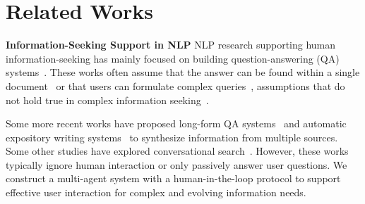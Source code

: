 \documentclass[11pt]{article}
\begin{document}



\section{Related Works}

\noindent
\textbf{Information-Seeking Support in NLP}\quad
NLP research supporting human information-seeking has mainly focused on building question-answering (QA) systems~\citep{chen-etal-2017-reading, lee-etal-2019-latent,dasigi-etal-2021-dataset,levy-etal-2021-open,yuan-etal-2020-interactive-machine}. These works often assume that the answer can be found within a single document~\citep{clark-etal-2020-tydi} or that users can formulate complex queries~\citep{yang-etal-2018-hotpotqa,chen2021open,ahmadvand2023making}, assumptions that do not hold true in complex information seeking~\citep{butler2000learners,booth2009craft,bystrom1995task}.


Some more recent works have proposed long-form QA systems~\citep{xu-etal-2023-critical,xu2024kiwi} and automatic expository writing systems~\citep{balepur-etal-2023-expository,shen2023summarization,shao2024assisting} to synthesize information from multiple sources. %
Some other studies have explored conversational search~\citep{kumar-callan-2020-making,nakamura-etal-2022-hybridialogue}. %
However, these works typically ignore human interaction or only passively answer user questions. We construct a multi-agent system with a human-in-the-loop protocol to support effective user interaction for complex and evolving information needs.
\end{document}
